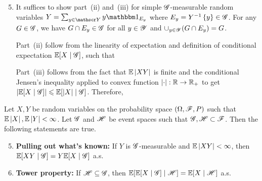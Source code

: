 \documentclass[12pt,aspectratio=169]{beamer}
\begin{document}
\begin{frame}
\begin{Proof}
\begin{enumerate}
\setcounter{enumi}{4}
\item It suffices to show part~(ii) and~(iii) for simple $\mathscr{G}$-measurable random variables $Y=\sum_{y\in\sY}y\Ind{E_y}$ where $E_y = Y^{-1}\left\{y\right\} \in \mathscr{G}$. %
For any $G\in\mathscr{G}$, we have $G\cap E_y\in\mathscr{G}$ for all $y \in \mathscr{Y}$ and $\cup_{y\in\mathscr{Y}}(G\cap E_y) = G$. 

Part~(ii) follow from the linearity of expectation and definition of conditional expectation $\mathbb{E}[X\mid\mathscr{G}]$, 
such that  

Part~(iii) follows from the fact that $\mathbb{E}\left\lvert XY\right\rvert$ is finite and the conditional Jensen's inequality applied to convex function $\left\lvert\cdot\right\rvert : \mathbb{R} \to \mathbb{R}_+$ to get $\left\lvert\mathbb{E}[X\mid\mathscr{G}]\right\rvert \leqslant \mathbb{E}[\left\lvert X\right\rvert\mid\mathscr{G}]$. 
Therefore, 
\end{enumerate}
\end{Proof}
\end{frame}


\begin{frame}
\begin{prop} 
Let $X,Y$ be random variables on the probability space $(\Omega, \mathscr{F}, P)$ such that $\mathbb{E}\left\lvert X\right\rvert , \mathbb{E}\left\lvert Y\right\rvert < \infty$. 
Let $\mathscr{G}$ and $\mathscr{H}$ be event spaces such that $\mathscr{G}, \mathscr{H} \subset \mathscr{F}$. 
Then the following statements are true. 
\begin{enumerate}
\setcounter{enumi}{4}
\item \textbf{Pulling out what's known:} If $Y$ is $\mathscr{G}$-measurable and $\mathbb{E}\left\lvert XY\right\rvert <\infty$, then
$\mathbb{E}[XY\mid \mathscr{G}] = Y\mathbb{E}[X\mid\mathscr{G}]$ a.s.
\item \textbf{Tower property:} If $\mathscr{H} \subseteq \mathscr{G}$, then
$\mathbb{E}[\mathbb{E}[X\mid\mathscr{G}]\mid \mathscr{H}] = \mathbb{E}[X\mid \mathscr{H}]$ a.s.
\end{enumerate}
\end{prop}
\end{frame}
\end{document}
